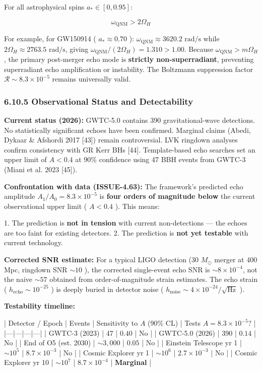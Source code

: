 \documentclass[11pt,a4paper]{article}
\theoremstyle{definition}
\theoremstyle{remark}
\begin{document}
For all astrophysical spins $a_* \in [0, 0.95]$:


\begin{equation}
\omega_{\text{QNM}} > 2 \Omega_H
\end{equation}


For example, for GW150914 ( $a_* \approx 0.70$ ): $\omega_{\text{QNM}} \approx 3620.2\text{ rad/s}$ while $2\Omega_H \approx 2763.5\text{ rad/s}$, giving $\omega_{\text{QNM}} / (2\Omega_H) = 1.310 > 1.00$.
Because $\omega_{\text{QNM}} > m\Omega_H$, the primary post-merger echo mode is \textbf{strictly non-superradiant}, preventing superradiant echo amplification or instability. The Boltzmann suppression factor $\mathcal{R} \sim 8.3 \times 10^{-5}$ remains universally valid.

\subsubsection{6.10.5 Observational Status and Detectability}

\textbf{Current status (2026):} GWTC-5.0 contains 390 gravitational-wave detections. No statistically significant echoes have been confirmed. Marginal claims (Abedi, Dykaar \& Afshordi 2017 [43]) remain controversial. LVK ringdown analyses confirm consistency with GR Kerr BHs [44]. Template-based echo searches set an upper limit of $A < 0.4$ at 90\% confidence using 47 BBH events from GWTC-3 (Miani et al. 2023 [45]).

\textbf{Confrontation with data (ISSUE-4.63):} The framework's predicted echo amplitude $A_1/A_0 = 8.3 \times 10^{-5}$ is \textbf{four orders of magnitude below} the current observational upper limit ( $A < 0.4$ ). This means:

1. The prediction is \textbf{not in tension} with current non-detections — the echoes are too faint for existing detectors.
2. The prediction is \textbf{not yet testable} with current technology.

\textbf{Corrected SNR estimate:} For a typical LIGO detection (30 $M_\odot$ merger at 400 Mpc, ringdown SNR $\sim 10$ ), the corrected single-event echo SNR is $\sim 8 \times 10^{-4}$, not the naive $\sim 57$ obtained from order-of-magnitude strain estimates. The echo strain ( $h_{\text{echo}} \sim 10^{-25}$ ) is deeply buried in detector noise ( $h_{\text{noise}} \sim 4 \times 10^{-24}/\sqrt{\text{Hz}}$ ).

\textbf{Testability timeline:}

| Detector / Epoch | Events | Sensitivity to $A$ (90\% CL) | Tests $A = 8.3 \times 10^{-5}$? |
|---|---|---|---|
| GWTC-3 (2023) | 47 | $0.40$ | No |
| GWTC-5.0 (2026) | 390 | $0.14$ | No |
| End of O5 (est. 2030) | $\sim 3{,}000$ | $0.05$ | No |
| Einstein Telescope yr 1 | $\sim 10^5$ | $8.7 \times 10^{-3}$ | No |
| Cosmic Explorer yr 1 | $\sim 10^6$ | $2.7 \times 10^{-3}$ | No |
| Cosmic Explorer yr 10 | $\sim 10^7$ | $8.7 \times 10^{-4}$ | \textbf{Marginal} |
\end{document}
